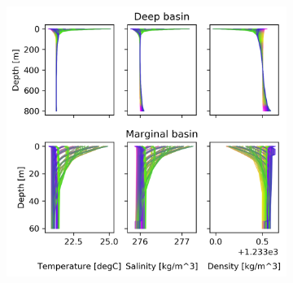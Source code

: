 \documentclass[twocolumn]{article}
\begin{document}
\begin{figure}
\centering
\begin{subfigure}[h]{0.70\textwidth}
\centering
\includegraphics[width=\linewidth,keepaspectratio]{60m_mar_depth_40yr.png}
\end{subfigure}\hfill
\begin{subfigure}[h]{0.20\textwidth}
\centering

\end{subfigure}
\end{figure}
\end{document}
